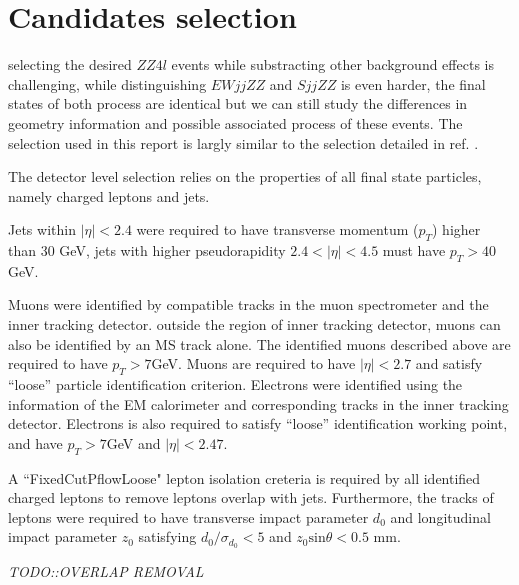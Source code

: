 \documentclass[12pt]{article}
\begin{document}
    \section{Candidates selection}
        \par selecting the desired $ZZ4l$ events while substracting other background effects 
        is challenging, while distinguishing $EW jjZZ$ and $S jjZZ$ is even harder, the 
        final states of both process are identical but we can still study the differences
        in geometry information and possible associated process of these events. The selection used in 
        this report is largly similar to the selection detailed in ref. \cite{ATLAS-CONF-2019-033}.
        \par The detector level selection relies on the properties of all final state particles, namely charged leptons
        and jets. 
        \par Jets within $|\eta| < 2.4$ were required to have transverse momentum ($p_{T}$) higher than 30 GeV,
        jets with higher pseudorapidity $2.4 < |\eta| < 4.5$ must have $p_T > 40$ GeV. 
        \par Muons were identified by compatible tracks in the muon spectrometer and the inner tracking detector. 
        outside the region of inner tracking detector, muons can also be identified by an MS track alone. 
        The identified muons described above are required to have $p_{T} > 7 $GeV. Muons are required to have $|\eta| < 2.7$  and satisfy
        ``loose'' particle identification criterion. Electrons were identified using the information of the EM calorimeter and 
        corresponding tracks in the inner tracking detector. Electrons is also required to satisfy ``loose'' identification working point, 
        and have $p_{T} > 7 $GeV and $|\eta| < 2.47$.
        \par A ``FixedCutPflowLoose" lepton isolation creteria\cite{Aaboud_2019} is required by all identified charged leptons to 
        remove leptons overlap with jets. Furthermore, the tracks of leptons were required to have transverse impact parameter $d_0$ and 
        longitudinal impact parameter $z_0$ satisfying $d_0/\sigma_{d_0} < \text{5}$ and $z_0\text{sin}\theta < 0.5 \text{\ mm}$.
        \par \emph{TODO::OVERLAP REMOVAL}
\end{document}

